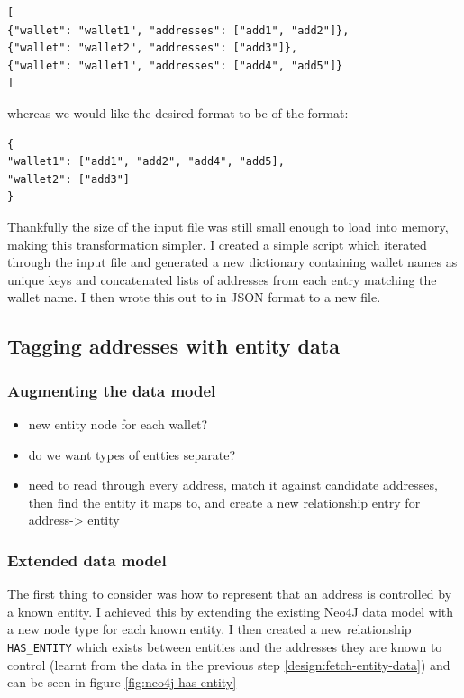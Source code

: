 \begin{lstlisting}
[
{"wallet": "wallet1", "addresses": ["add1", "add2"]},
{"wallet": "wallet2", "addresses": ["add3"]},
{"wallet": "wallet1", "addresses": ["add4", "add5"]}
]
\end{lstlisting}

whereas we would like the desired format to be of the format:

\begin{lstlisting}
{
"wallet1": ["add1", "add2", "add4", "add5],
"wallet2": ["add3"]
}
\end{lstlisting}
Thankfully the size of the input file was still small enough to load into memory, making this transformation simpler. I created a simple script which iterated through the input file and generated a new dictionary containing wallet names as unique keys and concatenated lists of addresses from each entry matching the wallet name. I then wrote this out to in JSON format to a new file. 


\subsection{Tagging addresses with entity data}
\subsubsection{Augmenting the data model}
\begin{itemize}
    \item new entity node for each wallet?
    \item do we want types of entties separate?
    \item need to read through every address, match it against candidate addresses,  then find the entity it maps to, and create a new relationship entry for  address-> entity
\end{itemize}

\subsubsection{Extended data model}
The first thing to consider was how to represent that an address is controlled by a known entity. I achieved this by extending the existing Neo4J data model with a new node type for each known entity. I then created a new relationship \texttt{HAS\_ENTITY} which exists between entities and the addresses they are known to control (learnt from the data in the previous step \ref{design:fetch-entity-data}) and can be seen in figure \ref{fig:neo4j-has-entity} 

